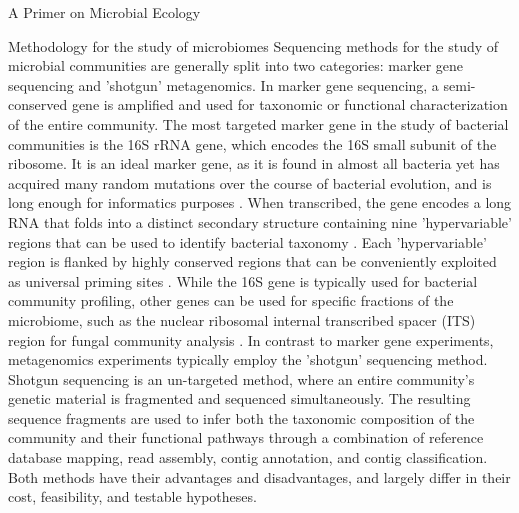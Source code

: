 \documentclass[oneside,12pt,final]{sty/ucthesis-CA2012}
\begin{document}
\begin{mainmatter}
\begin{section}{A Primer on Microbial Ecology}
\begin{subsection}{Methodology for the study of microbiomes}
Sequencing methods for the study of microbial communities are generally split into two categories: marker gene sequencing and 'shotgun' metagenomics. In marker gene sequencing, a semi-conserved gene is amplified and used for taxonomic or functional characterization of the entire community. The most targeted marker gene in the study of bacterial communities is the 16S rRNA gene, which encodes the 16S small subunit of the ribosome. It is an ideal marker gene, as it is found in almost all bacteria yet has acquired many random mutations over the course of bacterial evolution, and is long enough for informatics purposes \cite{RN90, RN91}. When transcribed, the gene encodes a long RNA that folds into a distinct secondary structure containing nine 'hypervariable' regions that can be used to identify bacterial taxonomy \cite{RN92, RN93}. Each 'hypervariable' region is flanked by highly conserved regions that can be conveniently exploited as universal priming sites \cite{RN94}. While the 16S gene is typically used for bacterial community profiling, other genes can be used for specific fractions of the microbiome, such as the nuclear ribosomal internal transcribed spacer (ITS) region for fungal community analysis \cite{RN95}. In contrast to marker gene experiments, metagenomics experiments typically employ the 'shotgun' sequencing method. Shotgun sequencing is an un-targeted method, where an entire community's genetic material is fragmented and sequenced simultaneously. The resulting sequence fragments are used to infer both the taxonomic composition of the community and their functional pathways through a combination of reference database mapping, read assembly, contig annotation, and contig classification. Both methods have their advantages and disadvantages, and largely differ in their cost, feasibility, and testable hypotheses.


\end{subsection}
\end{section}
\end{mainmatter}
\end{document}
